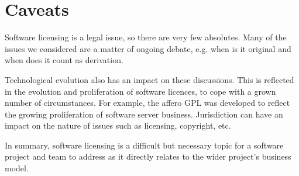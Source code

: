 \documentclass[a4paper, openany]{memoir}
\begin{document}
\section{Caveats}
Software licensing is a legal issue, so there are very few absolutes. Many of the issues we considered are a matter of ongoing debate, e.g. when is it original and when does it count as derivation. 

Technological evolution also has an impact on these discussions. This is reflected in the evolution and proliferation of software licences, to cope with a grown number of circumstances. For example, the affero GPL was developed to reflect the growing proliferation of software server business. Jurisdiction can have an impact on the nature of issues such as licensing, copyright, etc.

In summary, software licensing is a difficult but necessary topic for a software project and team to address as it directly relates to the wider project's business model.
\end{document}
